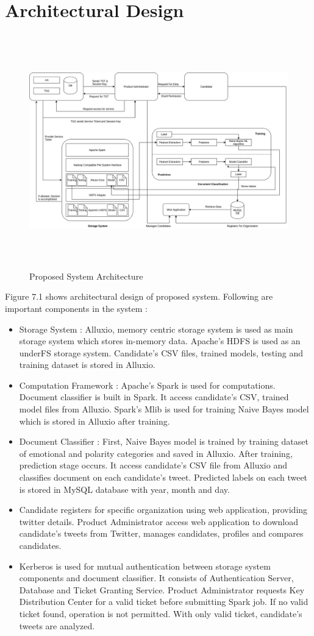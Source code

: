 \documentclass[oneside,a4paper,12pt]{pictreport}
\begin{document}
\section{Architectural Design}
\begin{figure}[!h]
\includegraphics[width=5.7in,height=4.0in]{Architecture.jpg}
\caption{Proposed System Architecture}
\end{figure}
Figure 7.1 shows architectural design of proposed system. Following are important components in the system :
\begin{itemize}
\item Storage System : Alluxio, memory centric storage system is used as main storage system which stores in-memory data. Apache's HDFS is used as an underFS storage system. Candidate's CSV files, trained models, testing and training dataset is stored in Alluxio.
\item Computation Framework : Apache's Spark is used for computations. Document classifier is built in Spark. It access candidate's CSV, trained model files from Alluxio. Spark's Mlib is used for training Naive Bayes model which is stored in Alluxio after training.
\item Document Classifier : First, Naive Bayes model is trained by training dataset of emotional and polarity categories and saved in Alluxio. After training, prediction stage occurs. It access candidate's CSV file from Alluxio and classifies document on each candidate's tweet. Predicted labels on each tweet is stored in MySQL database with year, month and day.
\item Candidate registers for specific organization using web application, providing twitter details. Product Administrator access web application to download candidate's tweets from Twitter, manages candidates, profiles and compares candidates. 
\item Kerberos is  used for mutual authentication between storage system components and document classifier. It consists of Authentication Server, Database and Ticket Granting Service. Product Administrator requests Key Distribution Center for a valid ticket before submitting Spark job. If no valid ticket found, operation is not permitted. With only valid ticket, candidate's tweets are analyzed.  
\end{itemize}
\end{document}
